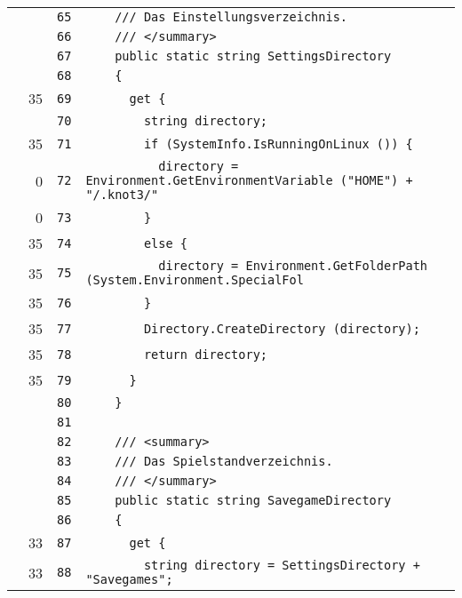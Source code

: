 \documentclass[a4paper,10pt]{article}
\begin{document}
\begin{longtable}[l]{lrrl}
\cellcolor{gray} &  & \verb~65~ & \verb~    /// Das Einstellungsverzeichnis.~\\
\cellcolor{gray} &  & \verb~66~ & \verb~    /// </summary>~\\
\cellcolor{gray} &  & \verb~67~ & \verb~    public static string SettingsDirectory~\\
\cellcolor{gray} &  & \verb~68~ & \verb~    {~\\
\cellcolor{green} & 35 & \verb~69~ & \verb~      get {~\\
\cellcolor{gray} &  & \verb~70~ & \verb~        string directory;~\\
\cellcolor{green} & 35 & \verb~71~ & \verb~        if (SystemInfo.IsRunningOnLinux ()) {~\\
\cellcolor{red} & 0 & \verb~72~ & \verb~          directory = Environment.GetEnvironmentVariable ("HOME") + "/.knot3/"~\\
\cellcolor{red} & 0 & \verb~73~ & \verb~        }~\\
\cellcolor{green} & 35 & \verb~74~ & \verb~        else {~\\
\cellcolor{green} & 35 & \verb~75~ & \verb~          directory = Environment.GetFolderPath (System.Environment.SpecialFol~\\
\cellcolor{green} & 35 & \verb~76~ & \verb~        }~\\
\cellcolor{green} & 35 & \verb~77~ & \verb~        Directory.CreateDirectory (directory);~\\
\cellcolor{green} & 35 & \verb~78~ & \verb~        return directory;~\\
\cellcolor{green} & 35 & \verb~79~ & \verb~      }~\\
\cellcolor{gray} &  & \verb~80~ & \verb~    }~\\
\cellcolor{gray} &  & \verb~81~ & \verb~~\\
\cellcolor{gray} &  & \verb~82~ & \verb~    /// <summary>~\\
\cellcolor{gray} &  & \verb~83~ & \verb~    /// Das Spielstandverzeichnis.~\\
\cellcolor{gray} &  & \verb~84~ & \verb~    /// </summary>~\\
\cellcolor{gray} &  & \verb~85~ & \verb~    public static string SavegameDirectory~\\
\cellcolor{gray} &  & \verb~86~ & \verb~    {~\\
\cellcolor{green} & 33 & \verb~87~ & \verb~      get {~\\
\cellcolor{green} & 33 & \verb~88~ & \verb~        string directory = SettingsDirectory + "Savegames";~\\

\end{longtable}
\end{document}
